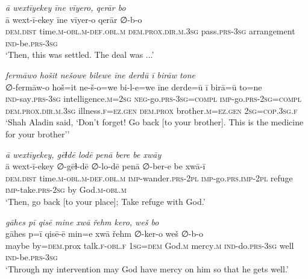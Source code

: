\ea \label{DG.55}
\textit{ā wextīyekey īne vīyero, qerār bo} \\ 
\gll ā wext-ī-ekey īne vīyer-o qerār ∅-b-o \\ 
 \textsc{dem.dist} time\textsc{.m}\textsc{-obl}\textsc{.m}\textsc{-def}\textsc{.obl}\textsc{.m} \textsc{dem.prox}\textsc{.dir}\textsc{.m}\textsc{.3sg} pass\textsc{.prs}\textsc{-3sg} arrangement \textsc{ind-}be\textsc{.prs}\textsc{-3sg} \\ 
\glt `Then, this was settled. The deal was ...'
\z 
 
\ea \label{DG.56}
\textit{fermāwo hošit nešowe bilewe īne derdū ī birāw tone} \\ 
\gll ∅-fermāw-o hoš=it ne-š-o=we bi-l-e=we īne derde=ū ī birā=ū to=ne \\ 
 \textsc{ind-}say\textsc{.prs}\textsc{-3sg} intelligence\textsc{.m}\textsc{=\textsc{2sg}} \textsc{neg-}go\textsc{.prs}\textsc{-3sg}\textsc{=\textsc{compl}} \textsc{imp-}go\textsc{.prs}-\textsc{2sg}\textsc{=compl} \textsc{dem.prox}\textsc{.dir}\textsc{.m}\textsc{.3sg} illness\textsc{\textsc{.f}}\textsc{=ez}\textsc{.gen} \textsc{dem.prox} brother\textsc{.m}\textsc{=ez}\textsc{.gen} \textsc{2sg}\textsc{=cop}\textsc{.3sg}\textsc{\textsc{.f}} \\ 
\glt `Shah Aladin said, ‘Don’t forget! Go back [to your brother]. This is the medicine for your brother’'
\z 
 
\ea \label{DG.58}
\textit{ā wextīyekey, gēɫdē lodē penā bere be xwāy} \\ 
\gll ā wext-ī-ekey ∅-gēɫ-dē ∅-lo-dē penā ∅-ber-e be xwā-ī \\ 
 \textsc{dem.dist} time\textsc{.m}\textsc{-obl}\textsc{.m}\textsc{-def}\textsc{.obl}\textsc{.m} \textsc{imp-}wander\textsc{.prs}\textsc{-2pl} \textsc{imp-}go\textsc{.prs}\textsc{.imp}\textsc{-2pl} refuge \textsc{imp-}take\textsc{.prs}-\textsc{2sg} by God\textsc{.m}\textsc{-obl}\textsc{.m} \\ 
\glt `Then, go back [to your place]; Take refuge with God.'
\z 
 
\ea \label{DG.59}
\textit{gāhes pī qisē mine xwā řehm kero, weš bo} \\ 
\gll gāhes p=ī qisē-ē min=e xwā řehm ∅-ker-o weš ∅-b-o \\ 
 maybe by\textsc{=dem}.prox talk\textsc{\textsc{.f}}\textsc{-obl}\textsc{\textsc{.f}} \textsc{1sg}\textsc{=dem} God\textsc{.m} mercy\textsc{.m} \textsc{ind-}do\textsc{.prs}\textsc{-3sg} well \textsc{ind-}be\textsc{.prs}\textsc{-3sg} \\ 
\glt `Through my intervention may God have mercy on him so that he gets well.'
\z 
 
